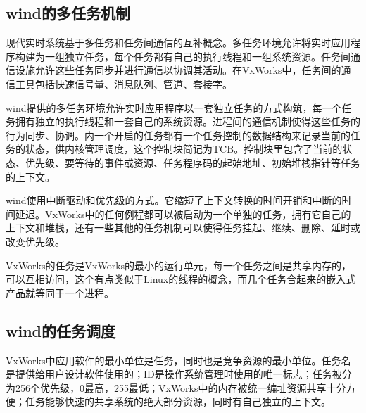 \subsection{wind的多任务机制}
	现代实时系统基于多任务和任务间通信的互补概念。多任务环境允许将实时应用程序构建为一组独立任务，每个任务都有自己的执行线程和一组系统资源。任务间通信设施允许这些任务同步并进行通信以协调其活动。在VxWorks中，任务间的通信工具包括快速信号量、消息队列、管道、套接字。
	
	wind提供的多任务环境允许实时应用程序以一套独立任务的方式构筑，每一个任务拥有独立的执行线程和一套自己的系统资源。进程间的通信机制使得这些任务的行为同步、协调。内一个开启的任务都有一个任务控制的数据结构来记录当前的任务的状态，供内核管理调度，这个控制块简记为TCB。控制块里包含了当前的状态、优先级、要等待的事件或资源、任务程序码的起始地址、初始堆栈指针等任务的上下文。
	
	wind使用中断驱动和优先级的方式。它缩短了上下文转换的时间开销和中断的时间延迟。VxWorks中的任何例程都可以被启动为一个单独的任务，拥有它自己的上下文和堆栈，还有一些其他的任务机制可以使得任务挂起、继续、删除、延时或改变优先级。	

	
	VxWorks的任务是VxWorks的最小的运行单元，每一个任务之间是共享内存的，可以互相访问，这个有点类似于Linux的线程的概念，而几个任务合起来的嵌入式产品就等同于一个进程。

\subsection{wind的任务调度}

	VxWorks中应用软件的最小单位是任务，同时也是竞争资源的最小单位。任务名是提供给用户设计软件使用的；ID是操作系统管理时使用的唯一标志；任务被分为256个优先级，0最高，255最低；VxWorks中的内存被统一编址资源共享十分方便；任务能够快速的共享系统的绝大部分资源，同时有自己独立的上下文。
	

